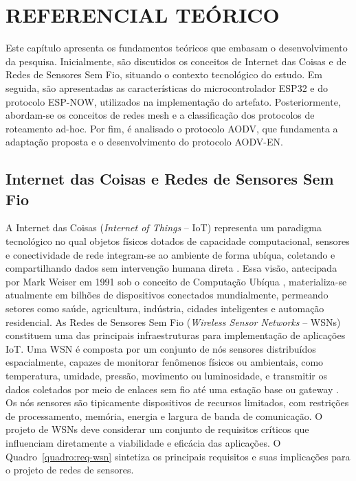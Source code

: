 \chapter{REFERENCIAL TEÓRICO}\label{cap:referencial}\label{referencial-teuxf3rico}

Este capítulo apresenta os fundamentos teóricos que embasam o
desenvolvimento da pesquisa. Inicialmente, são discutidos os conceitos
de Internet das Coisas e de Redes de Sensores Sem Fio, situando o
contexto tecnológico do estudo. Em seguida, são apresentadas as
características do microcontrolador ESP32 e do protocolo ESP-NOW,
utilizados na implementação do artefato. Posteriormente, abordam-se os
conceitos de redes mesh e a classificação dos protocolos de roteamento
ad-hoc. Por fim, é analisado o protocolo AODV, que fundamenta a
adaptação proposta e o desenvolvimento do protocolo AODV-EN.

\section{Internet das Coisas e Redes de Sensores Sem
Fio}\label{internet-das-coisas-e-redes-de-sensores-sem-fio}

A Internet das Coisas (\emph{Internet of Things} -- IoT) representa um
paradigma tecnológico no qual objetos físicos dotados de capacidade
computacional, sensores e conectividade de rede integram-se ao ambiente
de forma ubíqua, coletando e compartilhando dados sem intervenção humana
direta \cite{priyadarshi2025}. Essa visão, antecipada por Mark Weiser em
1991 sob o conceito de Computação Ubíqua \cite{weiser1991}, materializa-se atualmente em
bilhões de dispositivos conectados mundialmente, permeando setores como
saúde, agricultura, indústria, cidades inteligentes e automação
residencial. As Redes de Sensores Sem Fio (\emph{Wireless Sensor
Networks} -- WSNs) constituem uma das principais infraestruturas para
implementação de aplicações IoT. Uma WSN é composta por um conjunto de
nós sensores distribuídos espacialmente, capazes de monitorar fenômenos
físicos ou ambientais, como temperatura, umidade, pressão, movimento ou
luminosidade, e transmitir os dados coletados por meio de enlaces sem fio
até uma estação base ou gateway \cite{chaizeng2021}. Os nós sensores são
tipicamente dispositivos de recursos limitados, com restrições de
processamento, memória, energia e largura de banda de comunicação. O
projeto de WSNs deve considerar um conjunto de requisitos críticos que
influenciam diretamente a viabilidade e eficácia das aplicações. O
Quadro~\ref{quadro:req-wsn} sintetiza os principais requisitos e suas implicações para o
projeto de redes de sensores.

